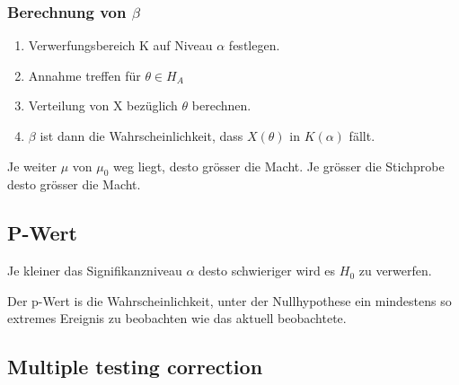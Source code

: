 \documentclass[8pt,a4paper]{scrartcl}
\begin{document}
\begin{multicols*}{3}
\subsubsection*{Berechnung von $\beta$}

\begin{enumerate}
\ncompaq
\item Verwerfungsbereich K auf Niveau $\alpha$ festlegen.
\item Annahme treffen für $\theta\in H_A$
\item Verteilung von X bezüglich $\theta$ berechnen.
\item $\beta$ ist dann die Wahrscheinlichkeit, dass $X(\theta)$ in $K(\alpha)$ fällt.
\end{enumerate}

Je weiter $\mu$ von $\mu_0$ weg liegt, desto grösser die Macht. Je grösser die Stichprobe desto grösser die Macht.


\newpage

\subsection{P-Wert}

Je kleiner das Signifikanzniveau $\alpha$ desto schwieriger wird es $H_0$ zu verwerfen.

Der p-Wert is die Wahrscheinlichkeit, unter der Nullhypothese ein mindestens so extremes Ereignis zu beobachten wie das aktuell beobachtete.






\subsection{Multiple testing correction}


\end{multicols*}
\end{document}
